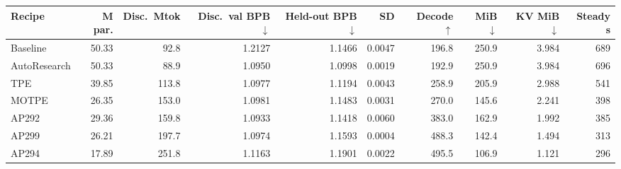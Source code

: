 \begin{tabular}{lrrrrrrrrr}
\toprule
Recipe & M par. & Disc.\ Mtok & Disc.\ val BPB $\downarrow$ & Held-out BPB $\downarrow$ & SD & Decode $\uparrow$ & MiB $\downarrow$ & KV MiB $\downarrow$ & Steady s \\
\midrule
Baseline & 50.33 & 92.8 & 1.2127 & 1.1466 & 0.0047 & 196.8 & 250.9 & 3.984 & 689 \\
AutoResearch & 50.33 & 88.9 & 1.0950 & 1.0998 & 0.0019 & 192.9 & 250.9 & 3.984 & 696 \\
TPE & 39.85 & 113.8 & 1.0977 & 1.1194 & 0.0043 & 258.9 & 205.9 & 2.988 & 541 \\
MOTPE & 26.35 & 153.0 & 1.0981 & 1.1483 & 0.0031 & 270.0 & 145.6 & 2.241 & 398 \\
AP292 & 29.36 & 159.8 & 1.0933 & 1.1418 & 0.0060 & 383.0 & 162.9 & 1.992 & 385 \\
AP299 & 26.21 & 197.7 & 1.0974 & 1.1593 & 0.0004 & 488.3 & 142.4 & 1.494 & 313 \\
AP294 & 17.89 & 251.8 & 1.1163 & 1.1901 & 0.0022 & 495.5 & 106.9 & 1.121 & 296 \\
\bottomrule
\end{tabular}
